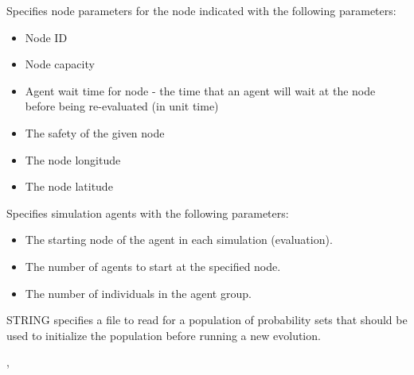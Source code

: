 \documentclass[11pt]{article}
\begin{document}
\begin{enumerate}
Specifies node parameters for the node indicated with the following parameters:
\begin{itemize}
	\item Node ID
	\item Node capacity
	\item Agent wait time for node - the time that an agent will wait at the node before being re-evaluated (in unit time)
	\item The safety of the given node
	\item The node longitude
	\item The node latitude
\end{itemize}

\production {} \arr {}   

Specifies simulation agents with the following parameters:
\begin{itemize}
	\item The starting node of the agent in each simulation (evaluation).
	\item The number of agents to start at the specified node.
	\item The number of individuals in the agent group.
\end{itemize}

\production {} \arr {} 

STRING specifies a file to read for a population of probability sets that should be used to initialize the population before running a new evolution.

\production {} \arr {} \sep \key{*}






\end{enumerate}
\end{document}
